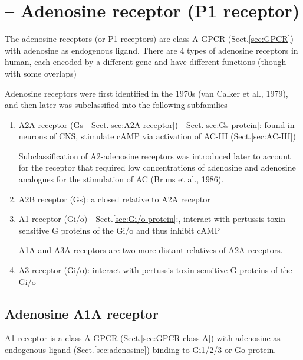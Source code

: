 \section{-- Adenosine receptor (P1 receptor)}
\label{sec:adenosine-receptor}
\label{sec:P1-receptor}


The adenosine receptors (or P1 receptors) are %
class A GPCR (Sect.\ref{sec:GPCR}) with adenosine as endogenous ligand. There
are 4 types of adenosine receptors in human, each encoded by a different gene and have
different functions (though with some overlaps)

Adenosine receptors were first identified in the 1970s (van Calker et al.,
1979), and then later was subclassified into the following subfamilies
\begin{enumerate}
  
  \item A2A receptor (Gs - Sect.\ref{sec:A2A-receptor}) -
  Sect.\ref{sec:Gs-protein}: found  in neurons of CNS, stimulate cAMP 
  via activation of AC-III (Sect.\ref{sec:AC-III})
  
Subclassification of A2-adenosine receptors was introduced later to account for
the receptor that required low concentrations of adenosine and adenosine
analogues for the stimulation of AC (Bruns et al., 1986).
  
  \item A2B receptor (Gs): a closed relative to A2A receptor


  \item A1 receptor (Gi/o) - Sect.\ref{sec:Gi/o-protein}:,
  interact with pertussis-toxin-sensitive G proteins of the Gi/o and thus
  inhibit cAMP

A1A and A3A receptors are two more distant relatives of A2A receptors.

  \item A3 receptor (Gi/o):
  interact with pertussis-toxin-sensitive G proteins of the Gi/o
  
\end{enumerate}

\subsection{Adenosine A1A receptor}
\label{sec:A1A-receptor}
\label{sec:Adenosine-A1A-receptor}

A1 receptor is a class A GPCR (Sect.\ref{sec:GPCR-class-A}) with adenosine as
endogenous ligand (Sect.\ref{sec:adenosine}) binding to Gi1/2/3 or Go protein.

